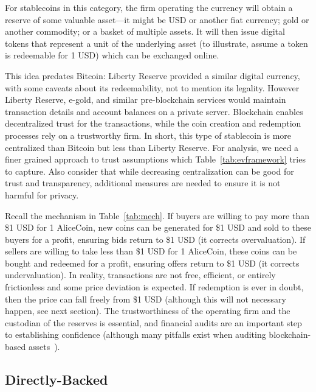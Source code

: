 For stablecoins in this category, the firm operating the currency will obtain a reserve of some valuable asset---it might be USD or another fiat currency; gold or another commodity; or a basket of multiple assets.  It will then issue digital tokens that represent a unit of the underlying asset (to illustrate, assume a token is redeemable for 1 USD) which can be exchanged online.

This idea predates Bitcoin: Liberty Reserve provided a similar digital currency, with some caveats about its redeemability, not to mention its legality. However Liberty Reserve, e-gold, and similar pre-blockchain services would maintain transaction details and account balances on a private server. Blockchain enables decentralized trust for the transactions, while the coin creation and redemption processes rely on a trustworthy firm. In short, this type of stablecoin is more centralized than Bitcoin but less than Liberty Reserve. For analysis, we need a finer grained approach to trust assumptions which Table~\ref{tab:evframework} tries to capture. Also consider that while decreasing centralization can be good for trust and transparency, additional measures are needed to ensure it is not harmful for privacy.

Recall the mechanism in Table~\ref{tab:mech}. If buyers are willing to pay more than \$1 USD for 1 AliceCoin, new coins can be generated for \$1 USD and sold to these buyers for a profit, ensuring bids return to \$1 USD (it corrects overvaluation). If sellers are willing to take less than \$1 USD for 1 AliceCoin, these coins can be bought and redeemed for a profit, ensuring offers return to \$1 USD (it corrects undervaluation). In reality, transactions are not free, efficient, or entirely frictionless and some price deviation is expected. If redemption is ever in doubt, then the price can fall freely from \$1 USD (although this will not necessary happen, see next section). The trustworthiness of the operating firm and the custodian of the reserves is essential, and financial audits are an important step to establishing confidence (although many pitfalls exist when auditing blockchain-based assets~\cite{PBEC19}). 


\subsection{Directly-Backed}
\label{sec:tether}

